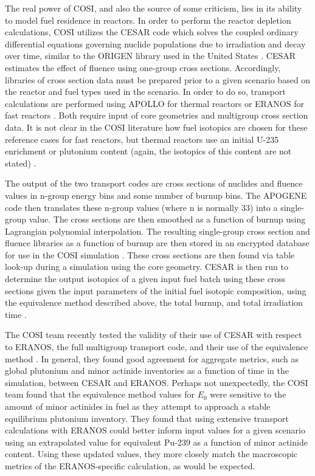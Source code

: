 The real power of COSI, and also the source of some criticism, lies in its
ability to model fuel residence in reactors. In order to perform the reactor
depletion calculations, COSI utilizes the CESAR code \cite{vidal_cesar:_2006}
which solves the coupled ordinary differential equations governing nuclide
populations due to irradiation and decay over time, similar to the ORIGEN
library used in the United States \cite{bell_origen_1973}. CESAR estimates the
effect of fluence using one-group cross sections. Accordingly, libraries of
cross section data must be prepared prior to a given scenario based on the
reactor and fuel types used in the scenario. In order to do so, transport
calculations are performed using APOLLO \cite{santamarina_2009_apollo2} for
thermal reactors or ERANOS for fast reactors \cite{ruggieri_2006_eranos}. Both
require input of core geometries and multigroup cross section data. It is not
clear in the COSI literature how fuel isotopics are chosen for these reference
cases for fast reactors, but thermal reactors use an initial U-235 enrichment or
plutonium content (again, the isotopics of this content are not
stated) \cite{guerin_benchmark_2009}.

The output of the two transport codes are cross sections of nuclides and fluence
values in n-group energy bins and some number of burnup bins. The APOGENE code
then translates these n-group values (where n is normally 33) into a
single-group value. The cross sections are then smoothed as a function of burnup
using Lagrangian polynomial interpolation. The resulting single-group cross
section and fluence libraries as a function of burnup are then stored in an
encrypted database for use in the COSI
simulation \cite{atabekjana_2012_analysis}. These cross sections are then found
via table look-up during a simulation using the core geometry. CESAR is then run
to determine the output isotopics of a given input fuel batch using these cross
sections given the input parameters of the initial fuel isotopic composition,
using the equivalence method described above, the total burnup, and total
irradiation time \cite{coquelet-pascal_validation_2011}. 

The COSI team recently tested the validity of their use of CESAR with respect to
ERANOS, the full multigroup transport code, and their use of the equivalence
method \cite{coquelet-pascal_validation_2011}. In general, they found good
agreement for aggregate metrics, such as global plutonium and minor actinide
inventories as a function of time in the simulation, between CESAR and
ERANOS. Perhaps not unexpectedly, the COSI team found that the equivalence
method values for $E_0$ were sensitive to the amount of minor actinides in fuel
as they attempt to approach a stable equilibrium plutonium inventory. They found
that using extensive transport calculations with ERANOS could better inform
input values for a given scenario using an extrapolated value for equivalent
Pu-239 as a function of minor actinide content. Using these updated values, they
more closely match the macroscopic metrics of the ERANOS-specific calculation,
as would be expected.
